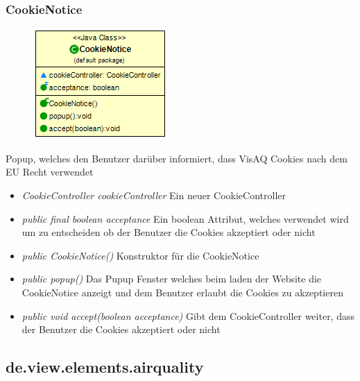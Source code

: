 \subsubsection{CookieNotice}
\begin{minipage}{0.3\textwidth}
    \begin{figure}[H]
        \includegraphics[scale = 0.5
        ]{media/view/CookieNotice_Class.png}
    \end{figure}
    \end{minipage} \hfill
    \begin{minipage}{0.6\textwidth}
Popup, welches den Benutzer darüber informiert, dass VisAQ Cookies nach dem EU Recht verwendet
\end{minipage}
\begin{itemize} [noitemsep]
    \item \emph{CookieController cookieController} Ein neuer CookieController
    \item \emph{public final boolean acceptance} Ein boolean Attribut, welches verwendet wird um zu entscheiden ob der Benutzer die Cookies akzeptiert oder nicht
    \item \emph{public CookieNotice()} Konstruktor für die CookieNotice
    \item \emph{public popup()} Das Pupup Fenster welches beim laden der Website die CookieNotice anzeigt und dem Benutzer erlaubt die Cookies zu akzeptieren
    \item \emph{public void accept(boolean acceptance)} Gibt dem CookieController weiter, dass der Benutzer die Cookies akzeptiert oder nicht
\end{itemize}


\subsection{de.view.elements.airquality}

